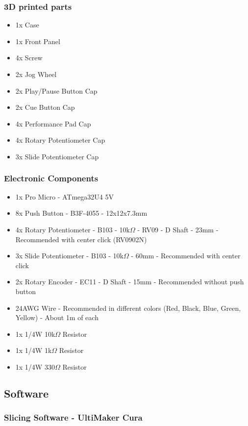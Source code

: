 \documentclass[12pt, a4paper]{article}
\begin{document}
			\subsubsection{3D printed parts}
				\begin{itemize}
					\item 1x Case
					\item 1x Front Panel
					\item 4x Screw
					\item 2x Jog Wheel
					\item 2x Play/Pause Button Cap
					\item 2x Cue Button Cap
					\item 4x Performance Pad Cap
					\item 4x Rotary Potentiometer Cap
					\item 3x Slide Potentiometer Cap
				\end{itemize}
			
			\subsubsection{Electronic Components}
				\begin{itemize}
					\item 1x Pro Micro - ATmega32U4 5V 
					\item 8x Push Button - B3F-4055 - 12x12x7.3mm
					\item 4x Rotary Potentiometer - B103 - 10k$\Omega$ - RV09 - D Shaft - 23mm - Recommended with center click (RV0902N)
					\item 3x Slide Potentiometer - B103 - 10k$\Omega$ - 60mm - Recommended with center click
					\item 2x Rotary Encoder - EC11 - D Shaft - 15mm - Recommended without push button
					\item 24AWG Wire - Recommended in different colors (Red, Black, Blue, Green, Yellow) - About 1m of each
					\item 1x 1/4W 10k$\Omega$ Resistor
					\item 1x 1/4W 1k$\Omega$ Resistor
					\item 1x 1/4W 330$\Omega$ Resistor
				\end{itemize}


		\subsection{Software}
		
			\subsubsection{Slicing Software - UltiMaker Cura}
			
\end{document}
